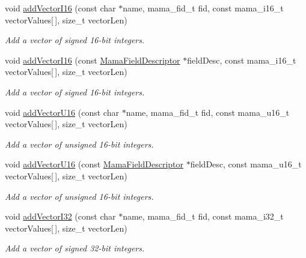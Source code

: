 \begin{DoxyCompactItemize}
void \hyperlink{classWombat_1_1MamaMsg_aa706f8a179fb8656e365d19f9f78aad1}{addVectorI16} (const char $\ast$name, mama\_\-fid\_\-t fid, const mama\_\-i16\_\-t vectorValues\mbox{[}$\,$\mbox{]}, size\_\-t vectorLen)
\begin{DoxyCompactList}\small\item\em Add a vector of signed 16-\/bit integers. \item\end{DoxyCompactList}\item 
void \hyperlink{classWombat_1_1MamaMsg_af78932656fc139326d0b92dedb085fd3}{addVectorI16} (const \hyperlink{classWombat_1_1MamaFieldDescriptor}{MamaFieldDescriptor} $\ast$fieldDesc, const mama\_\-i16\_\-t vectorValues\mbox{[}$\,$\mbox{]}, size\_\-t vectorLen)
\begin{DoxyCompactList}\small\item\em Add a vector of signed 16-\/bit integers. \item\end{DoxyCompactList}\item 
void \hyperlink{classWombat_1_1MamaMsg_ac8c52f630ea1507cd4fffac8cd1d69ef}{addVectorU16} (const char $\ast$name, mama\_\-fid\_\-t fid, const mama\_\-u16\_\-t vectorValues\mbox{[}$\,$\mbox{]}, size\_\-t vectorLen)
\begin{DoxyCompactList}\small\item\em Add a vector of unsigned 16-\/bit integers. \item\end{DoxyCompactList}\item 
void \hyperlink{classWombat_1_1MamaMsg_aaf6463e54b99ffa9bc5a7e2e99effa75}{addVectorU16} (const \hyperlink{classWombat_1_1MamaFieldDescriptor}{MamaFieldDescriptor} $\ast$fieldDesc, const mama\_\-u16\_\-t vectorValues\mbox{[}$\,$\mbox{]}, size\_\-t vectorLen)
\begin{DoxyCompactList}\small\item\em Add a vector of unsigned 16-\/bit integers. \item\end{DoxyCompactList}\item 
void \hyperlink{classWombat_1_1MamaMsg_a7db36a811a4d614aae1f547304afcd94}{addVectorI32} (const char $\ast$name, mama\_\-fid\_\-t fid, const mama\_\-i32\_\-t vectorValues\mbox{[}$\,$\mbox{]}, size\_\-t vectorLen)
\begin{DoxyCompactList}\small\item\em Add a vector of signed 32-\/bit integers. \item\end{DoxyCompactList}\item 

\end{DoxyCompactItemize}

